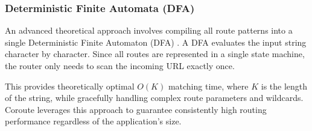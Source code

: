 \subsubsection{Deterministic Finite Automata (DFA)}

An advanced theoretical approach involves compiling all route patterns into a single Deterministic Finite Automaton (DFA) \cite{stankov2024regex}. A DFA evaluates the input string character by character. Since all routes are represented in a single state machine, the router only needs to scan the incoming URL exactly once.

This provides theoretically optimal $O(K)$ matching time, where $K$ is the length of the string, while gracefully handling complex route parameters and wildcards. Coroute leverages this approach to guarantee consistently high routing performance regardless of the application's size.
